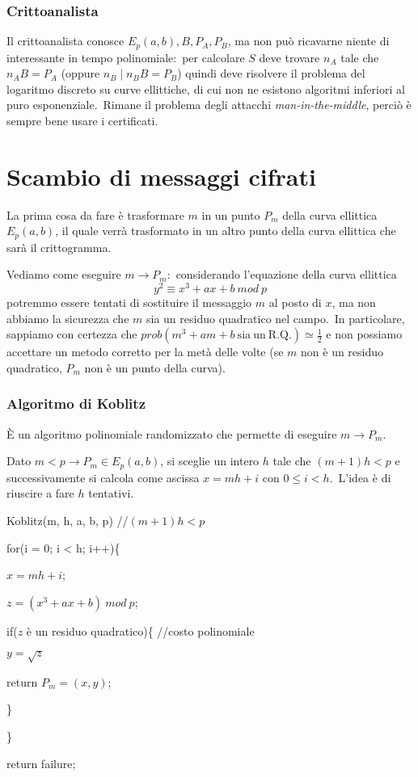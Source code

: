\subsubsection{Crittoanalista}

Il crittoanalista conosce $E_p(a, b), B, P_A, P_B$, ma non può ricavarne niente di interessante in tempo polinomiale:\ per calcolare $S$ deve trovare $n_A$ tale che $n_A B = P_A $ (oppure $n_B \mid n_B B = P_B $) quindi deve risolvere il problema del logaritmo discreto su curve ellittiche, di cui non ne esistono algoritmi inferiori al puro esponenziale.\
Rimane il problema degli attacchi \textit{man-in-the-middle}, perciò è sempre bene usare i certificati.\

\section{Scambio di messaggi cifrati}

La prima cosa da fare è trasformare $m$ in un punto $P_m$ della curva ellittica $E_p(a, b)$, il quale verrà trasformato in un altro punto della curva ellittica che sarà il crittogramma.\

Vediamo come eseguire $m \rightarrow P_m$:\ considerando l'equazione della curva ellittica
\[y^2 \equiv x^3 + ax + b\ \mathit{mod}\ p\]
potremmo essere tentati di sostituire il messaggio $m$ al posto di $x$, ma non abbiamo la sicurezza che $m$ sia un residuo quadratico nel campo.\
In particolare, sappiamo con certezza che $\mathit{prob}(m^3 + am + b\ \mathrm{sia\ un\ R.Q.}) \simeq \frac{1}{2}$ e non possiamo accettare un metodo corretto per la metà delle volte (se $m$ non è un residuo quadratico, $P_m$ non è un punto della curva).\

\subsubsection{Algoritmo di Koblitz}

È un algoritmo polinomiale randomizzato che permette di eseguire $m \rightarrow P_m$.\

Dato $m < p \rightarrow P_m \in E_p(a, b)$, si sceglie un intero $h$ tale che $(m + 1)h < p$ e successivamente si calcola come ascissa $x = mh + i$ con $0 \leq i < h$.\
L'idea è di riuscire a fare $h$ tentativi.\

\begin{flushleft}
    \ttfamily
    Koblitz(m, h, a, b, p) //$(m + 1)h < p$

    \quad for(i = 0; i < h; i++)\{

    \qquad $x = mh + i$;

    \qquad $z = (x^3 + ax + b)\ \mathit{mod}\ p$;

    \qquad if($z$ è un residuo quadratico)\{ //costo polinomiale

    \quad\qquad $y = \sqrt z$

    \quad\qquad return $P_m = (x, y)$;

    \qquad \}

    \quad \}

    \quad return failure;
\end{flushleft}

